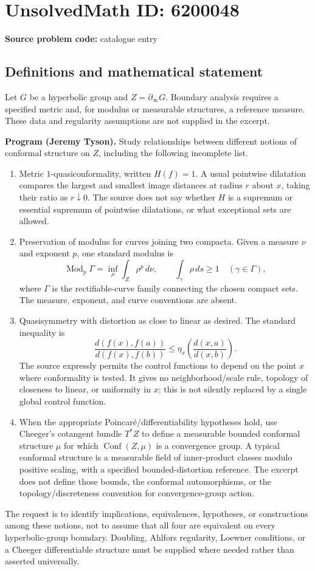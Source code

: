 \documentclass[11pt]{article}
\begin{document}
\section*{UnsolvedMath ID: 6200048}
\textbf{Source problem code:} catalogue entry
\subsection{Definitions and mathematical statement}
Let $G$ be a hyperbolic group and $Z=\partial_\infty G$. Boundary analysis requires a specified metric and, for modulus or measurable structures, a reference measure. These data and regularity assumptions are not supplied in the excerpt.

\textbf{Program (Jeremy Tyson).} Study relationships between different notions of conformal structure on $Z$, including the following incomplete list.
\begin{enumerate}
\item Metric $1$-quasiconformality, written $H(f)=1$. A usual pointwise dilatation compares the largest and smallest image distances at radius $r$ about $x$, taking their ratio as $r\downarrow0$. The source does not say whether $H$ is a supremum or essential supremum of pointwise dilatations, or what exceptional sets are allowed.
\item Preservation of modulus for curves joining two compacta. Given a measure $\nu$ and exponent $p$, one standard modulus is
\[
 \operatorname{Mod}_p\Gamma=\inf_\rho\int_Z\rho^p\,d\nu,
 \qquad\int_\gamma\rho\,ds\geq1\quad(\gamma\in\Gamma),
\]
where $\Gamma$ is the rectifiable-curve family connecting the chosen compact sets. The measure, exponent, and curve conventions are absent.
\item Quasisymmetry with distortion as close to linear as desired. The standard inequality is
\[
 \frac{d(f(x),f(a))}{d(f(x),f(b))}
 \leq\eta_x\left(\frac{d(x,a)}{d(x,b)}\right).
\]
The source expressly permits the control functions to depend on the point $x$ where conformality is tested. It gives no neighborhood/scale rule, topology of closeness to linear, or uniformity in $x$; this is not silently replaced by a single global control function.
\item When the appropriate Poincar\'e/differentiability hypotheses hold, use Cheeger's cotangent bundle $T^*Z$ to define a measurable bounded conformal structure $\mu$ for which $\operatorname{Conf}(Z,\mu)$ is a convergence group. A typical conformal structure is a measurable field of inner-product classes modulo positive scaling, with a specified bounded-distortion reference. The excerpt does not define those bounds, the conformal automorphisms, or the topology/discreteness convention for convergence-group action.
\end{enumerate}
The request is to identify implications, equivalences, hypotheses, or constructions among these notions, not to assume that all four are equivalent on every hyperbolic-group boundary. Doubling, Ahlfors regularity, Loewner conditions, or a Cheeger differentiable structure must be supplied where needed rather than asserted universally.
\end{document}
